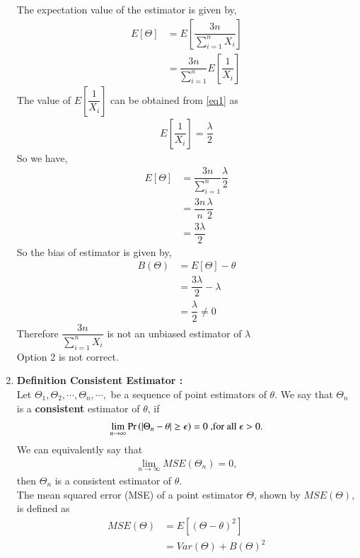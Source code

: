 \documentclass[journal,12pt,twocolumn]{IEEEtran}
\begin{document}
\begin{enumerate}
The expectation value of the estimator is given by, 
\begin{align}
    E[\Theta ] &= E  \left[   \dfrac{3n}{\sum_{i=1}^{n} X_i }  \right] \\
    & = \dfrac{3n}{\sum_{i=1}^{n}}  E  \left[ \dfrac{1}{X_i}  \right] 
\end{align}
The value of $  E  \left[ \dfrac{1}{X_i}  \right]  $ can be obtained from \eqref{eq1} as 
\begin{align} 
     E  \left[ \dfrac{1}{X_i}  \right] = \dfrac{\lambda}{2}
     \label{eq2}
\end{align}
So we have,
\begin{align}
     E[\Theta ] &= \dfrac{3n}{\sum_{i=1}^{n}} \dfrac{\lambda}{2} \\
     &= \dfrac{3n}{n} \dfrac{\lambda}{2} \\
     &= \dfrac{3\lambda}{2}
\end{align}
So the bias of estimator is given by,
\begin{align}
    B(\Theta) &= E[\Theta] - \theta  \\
    &= \dfrac{3\lambda}{2}- \lambda \\
    &= \dfrac{\lambda}{2} \neq 0
\end{align}
Therefore $ \dfrac{3n}{\sum_{i=1}^{n} X_i } $ is not an unbiased estimator of $ \lambda$ \\
Option 2 is not correct. \\
\item
\textbf{Definition Consistent Estimator : } \\
Let $ \Theta_1,\Theta_2, \cdots, \Theta_n , \cdots, $  be a sequence of point estimators of $ \theta $. We say that $ \Theta_n $ is a \textbf{consistent} estimator of $ \theta $, if 
\begin{align}
    \lim_{n\to\infty} \Pr\left(| \Theta_n - \theta | \ge \epsilon\right) = 0 \text{ ,for all $ \epsilon > 0$.}
\end{align}
We can equivalently say that 
\begin{align}
     \lim_{n\to\infty} MSE( \Theta_n) = 0,
\end{align}
then $ \Theta_n $ is a consistent estimator of $ \theta$. \\
The mean squared error (MSE) of a point estimator $ \Theta $, shown by $ MSE(\Theta) $, is defined as
\begin{align}
    MSE(\Theta ) &= E[(\Theta - \theta)^2] \\
    &= Var(\Theta) + B(\Theta)^2
\end{align}

\end{enumerate}
\end{document}
